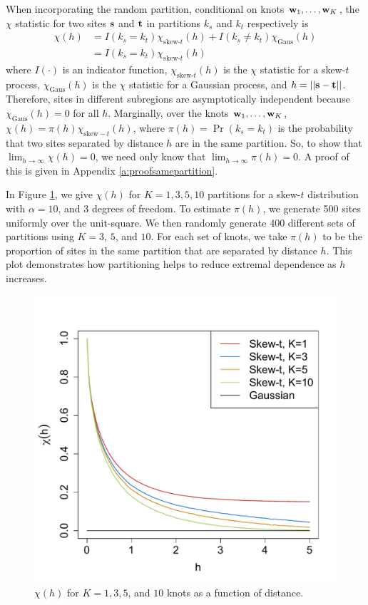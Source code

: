 \documentclass[11pt]{article}
\begin{document}
When incorporating the random partition, conditional on knots $\mbox{\bf w}_1, \ldots, \mbox{\bf w}_K$, the $\chi$ statistic for two sites $\mbox{\bf s}$ and $\mbox{\bf t}$ in partitions $k_s$ and $k_t$ respectively is
\begin{align}
  \chi(h) &= I(k_s = k_t) \chi_{\text{skew-}t}(h) + I(k_s \neq k_t) \chi_{\text{Gaus}}(h) \nonumber \\
         &= I(k_s = k_t) \chi_{\text{skew-}t}(h)
\end{align}
where $I(\cdot)$ is an indicator function, $\chi_{\text{skew-}t}(h)$ is the $\chi$ statistic for a skew-$t$ process, $\chi_{\text{Gaus}}(h)$ is the $\chi$ statistic for a Gaussian process, and $h = ||\mbox{\bf s} - \mbox{\bf t}||$.
Therefore, sites in different subregions are asymptotically independent because $\chi_{\text{Gaus}}(h) = 0$ for all $h$.
Marginally, over the knots $\mbox{\bf w}_1, \ldots, \mbox{\bf w}_K$, $\chi(h) = \pi(h) \chi_{\text{skew}-t}(h)$, where $\pi(h) = \Pr(k_s = k_t)$ is the probability that two sites separated by distance $h$ are in the same partition.
So, to show that $\lim_{h \rightarrow \infty} \chi(h) = 0$, we need only know that $\lim_{h \rightarrow \infty} \pi(h) = 0$. A proof of this is given in Appendix \ref{a:proofsamepartition}.

In Figure \ref{fig:chi}, we give $\chi(h)$ for $K = 1, 3, 5, 10$ partitions for a skew-$t$ distribution with $\alpha = 10$, and 3 degrees of freedom.
To estimate $\pi(h)$, we generate 500 sites uniformly over the unit-square.
We then randomly generate 400 different sets of partitions using $K = 3$, $5$, and $10$.
For each set of knots, we take $\pi(h)$ to be the proportion of sites in the same partition that are separated by distance $h$.
This plot demonstrates how partitioning helps to reduce extremal dependence as $h$ increases.

\begin{figure}
  \centering
  \includegraphics[width=0.5\linewidth]{plots/chi-h.pdf}
  \caption{$\chi(h)$ for $K = 1, 3, 5$, and $10$ knots as a function of distance.}
  \label{fig:chi}
\end{figure}
\end{document}
